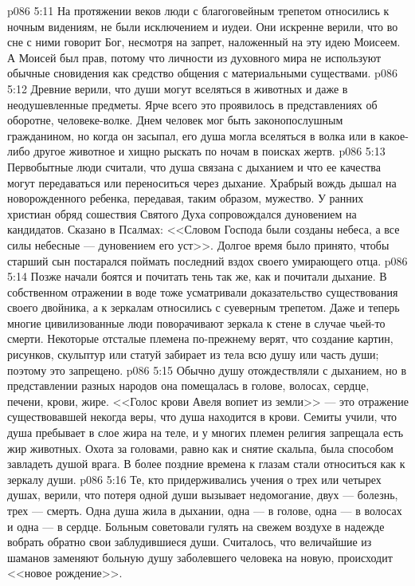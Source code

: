\vs p086 5:11 На протяжении веков люди с благоговейным трепетом относились к ночным видениям, не были исключением и иудеи. Они искренне верили, что во сне с ними говорит Бог, несмотря на запрет, наложенный на эту идею Моисеем. А Моисей был прав, потому что личности из духовного мира не используют обычные сновидения как средство общения с материальными существами.
\vs p086 5:12 Древние верили, что души могут вселяться в животных и даже в неодушевленные предметы. Ярче всего это проявилось в представлениях об оборотне, человеке\hyp{}волке. Днем человек мог быть законопослушным гражданином, но когда он засыпал, его душа могла вселяться в волка или в какое\hyp{}либо другое животное и хищно рыскать по ночам в поисках жертв.
\vs p086 5:13 Первобытные люди считали, что душа связана с дыханием и что ее качества могут передаваться или переноситься через дыхание. Храбрый вождь дышал на новорожденного ребенка, передавая, таким образом, мужество. У ранних христиан обряд сошествия Святого Духа сопровождался дуновением на кандидатов. Сказано в Псалмах: <<Словом Господа были созданы небеса, а все силы небесные --- дуновением его уст>>. Долгое время было принято, чтобы старший сын постарался поймать последний вздох своего умирающего отца.
\vs p086 5:14 Позже начали боятся и почитать тень так же, как и почитали дыхание. В собственном отражении в воде тоже усматривали доказательство существования своего двойника, а к зеркалам относились с суеверным трепетом. Даже и теперь многие цивилизованные люди поворачивают зеркала к стене в случае чьей\hyp{}то смерти. Некоторые отсталые племена по\hyp{}прежнему верят, что создание картин, рисунков, скульптур или статуй забирает из тела всю душу или часть души; поэтому это запрещено.
\vs p086 5:15 Обычно душу отождествляли с дыханием, но в представлении разных народов она помещалась в голове, волосах, сердце, печени, крови, жире. <<Голос крови Авеля вопиет из земли>> --- это отражение существовавшей некогда веры, что душа находится в крови. Семиты учили, что душа пребывает в слое жира на теле, и у многих племен религия запрещала есть жир животных. Охота за головами, равно как и снятие скальпа, была способом завладеть душой врага. В более поздние времена к глазам стали относиться как к зеркалу души.
\vs p086 5:16 Те, кто придерживались учения о трех или четырех душах, верили, что потеря одной души вызывает недомогание, двух --- болезнь, трех --- смерть. Одна душа жила в дыхании, одна --- в голове, одна --- в волосах и одна --- в сердце. Больным советовали гулять на свежем воздухе в надежде вобрать обратно свои заблудившиеся души. Считалось, что величайшие из шаманов заменяют больную душу заболевшего человека на новую, происходит <<новое рождение>>.
